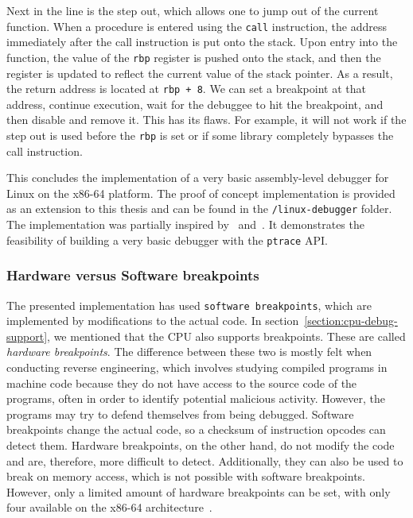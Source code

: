 Next in the line is the step out, which allows one to jump out of the current
function. When a procedure is entered using the \texttt{call} instruction, the
address immediately after the call instruction is put onto the stack. Upon
entry into the function, the value of the \texttt{rbp} register is pushed onto
the stack, and then the register is updated to reflect the current value of the
stack pointer. As a result, the return address is located at \texttt{rbp + 8}.
We can set a breakpoint at that address, continue execution, wait for the
debuggee to hit the breakpoint, and then disable and remove it. This has its
flaws. For example, it will not work if the step out is used before the
\texttt{rbp} is set or if some library completely bypasses the call
instruction.

This concludes the implementation of a very basic assembly-level debugger for
Linux on the x86-64 platform. The proof of concept implementation is provided
as an extension to this thesis and can be found in the \texttt{/linux-debugger}
folder. The implementation was partially inspired by~\cite{linux-debugger-blog}
and~\cite{lldb}. It demonstrates the feasibility of building a very basic
debugger with the \texttt{ptrace} API.

\subsubsection*{Hardware versus Software breakpoints}
The presented implementation has used \texttt{software breakpoints}, which are
implemented by modifications to the actual code. In
section~\ref{section:cpu-debug-support}, we mentioned that the CPU also
supports breakpoints. These are called \textit{hardware breakpoints}. The
difference between these two is mostly felt when conducting reverse
engineering, which involves studying compiled programs in machine code because
they do not have access to the source code of the programs, often in order to
identify potential malicious activity. However, the programs may try to defend
themselves from being debugged. Software breakpoints change the actual code, so
a checksum of instruction opcodes can detect them. Hardware breakpoints, on the
other hand, do not modify the code and are, therefore, more difficult to
detect. Additionally, they can also be used to break on memory access, which is
not possible with software breakpoints. However, only a limited amount of
hardware breakpoints can be set, with only four available on the x86-64
architecture~\cite{intel-manual}.

